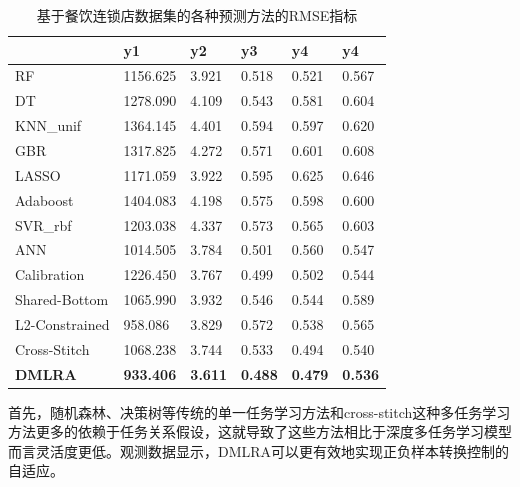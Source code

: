 \documentclass{llncs}
\begin{document}
\begin{table}[!hpt]
	\centering
	\caption{基于餐饮连锁店数据集的各种预测方法的RMSE指标}
	\label{tb:RMSEcanyin}
	\begin{tabular}{p{3cm}<{\centering}p{1.6cm}<{\centering}p{1.6cm}<{\centering}p{1.6cm}<{\centering}p{1.6cm}<{\centering}p{1.6cm}<{\centering}}
		\hline
		& \textbf{y1} & \textbf{y2} & \textbf{y3} & \textbf{y4} & \textbf{y4} \\ \hline
		RF & 1156.625 & 3.921 & 0.518 & 0.521 & 0.567 \\ %
		DT & 1278.090 & 4.109 & 0.543 & 0.581 & 0.604 \\ %
		KNN\_unif & 1364.145 & 4.401 & 0.594 & 0.597 & 0.620 \\ %
		GBR & 1317.825 & 4.272 & 0.571 & 0.601 & 0.608 \\ %
		LASSO & 1171.059 & 3.922 & 0.595 & 0.625 & 0.646 \\ %
		Adaboost & 1404.083 & 4.198 & 0.575 & 0.598 & 0.600 \\ %
		SVR\_rbf & 1203.038 & 4.337 & 0.573 & 0.565 & 0.603 \\ %
		ANN & 1014.505 & 3.784 & 0.501 & 0.560 & 0.547 \\ \hline
		Calibration & 1226.450 & 3.767 & 0.499 & 0.502 & 0.544 \\ %
		Shared-Bottom & 1065.990 & 3.932 & 0.546 & 0.544 & 0.589 \\ %
		L2-Constrained & 958.086 & 3.829 & 0.572 & 0.538 & 0.565 \\ %
		Cross-Stitch & 1068.238 & 3.744 & 0.533 & 0.494 & 0.540 \\ \hline
		\textbf{DMLRA} & \textbf{933.406} & \textbf{3.611} & \textbf{0.488} & \textbf{0.479} & \textbf{0.536}                 \\ \hline
	\end{tabular}
\end{table}

首先，随机森林、决策树等传统的单一任务学习方法和cross-stitch这种多任务学习方法更多的依赖于任务关系假设，这就导致了这些方法相比于深度多任务学习模型而言灵活度更低。观测数据显示，DMLRA可以更有效地实现正负样本转换控制的自适应。
\end{document}
